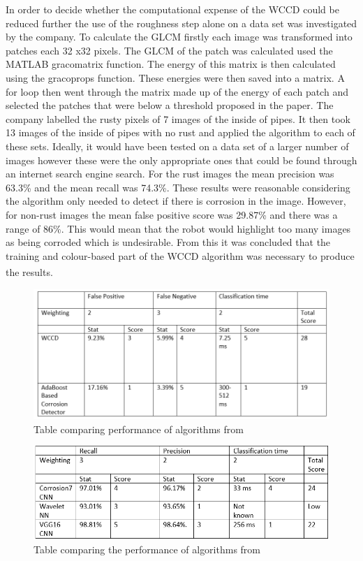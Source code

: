 \documentclass[11pt]{article}		%
\newlength{\imageheight}	 %
\newcommand{\supercite}[1]{\textsuperscript{\cite{#1}}}		%
\begin{document}
	        In order to decide whether the computational expense of the WCCD could be reduced further the use of the roughness step alone on a data set was investigated by the company. To calculate the GLCM firstly each image was transformed into patches each 32 x32 pixels. The GLCM of the patch was calculated used the MATLAB gracomatrix function. The energy of this matrix is then calculated using the gracoprops function. These energies were then saved into a matrix. A for loop then went through the matrix made up of the energy of each patch and selected the patches that were below a threshold proposed in the paper. The company labelled the rusty pixels of 7 images of the inside of pipes. It then took 13 images of the inside of pipes with no rust and applied the algorithm to each of these sets. Ideally, it would have been tested on a data set of a larger number of images however these were the only appropriate ones that could be found through an internet search engine search. For the rust images the mean precision was 63.3\% and the mean recall was 74.3\%. These results were reasonable considering the algorithm only needed to detect if there is corrosion in the image. However, for non-rust images the mean false positive score was 29.87\% and there was a range of 86\%. This would mean that the robot would highlight too many images as being corroded which is undesirable. From this it was concluded that the training and colour-based part of the WCCD algorithm was necessary to produce the results.\supercite{WCCD}  

			\begin{figure}[h]
				\centering
				\includegraphics[height=\imageheight]{Table_comparing_WCCD_AdaBoost_corrosion.PNG}
				\caption{Table comparing performance of algorithms from \cite{WCCD}}
				\label{WCCD_comparison}
			\end{figure}

			\begin{figure}[h]
				\centering
				\includegraphics[height=\imageheight]{Table_comparing_CNN_WNN_corrosion.PNG}
				\caption{Table comparing the performance of algorithms from \cite{Corrosion7}}
				\label{CNN_comparison}
			\end{figure}
\end{document}
